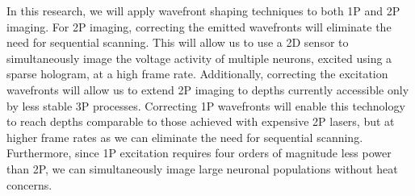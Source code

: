 In this research, we will apply wavefront shaping techniques to both 1P and 2P imaging. For 2P imaging, correcting the emitted wavefronts will eliminate the need for sequential scanning. This will allow us to use a 2D sensor to simultaneously image the voltage activity of multiple neurons, excited using a sparse hologram, at a high frame rate. Additionally, correcting the excitation wavefronts will allow us to extend 2P imaging to depths currently accessible only by less stable 3P processes. Correcting 1P wavefronts will enable this technology to reach depths comparable to those achieved with expensive 2P lasers, but at higher frame rates as we can eliminate the need for sequential scanning. Furthermore, since 1P excitation requires four orders of magnitude less power than 2P, we can simultaneously image large neuronal populations without heat concerns.


